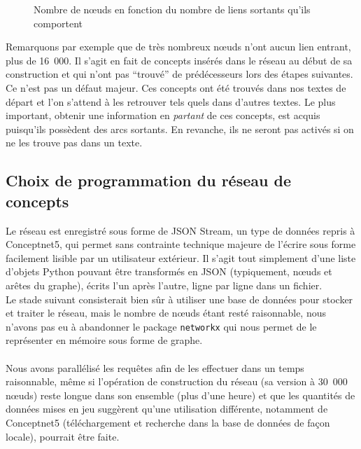 \documentclass[a4paper, 12pt]{article}
\newcommand{\pyt}[1]{\texttt{#1}}%
\begin{document}
\begin{figure}[h]
 \centering
 \caption{Nombre de n\oe{}uds en fonction du nombre de liens sortants qu'ils comportent}
 \label{fig:liens_sortants}
\end{figure}

Remarquons par exemple que de très nombreux n\oe{}uds n'ont aucun lien entrant, plus de 16~000. Il s'agit en fait de concepts insérés dans le réseau au début de sa construction et qui n'ont pas ``trouvé'' de prédécesseurs lors des étapes suivantes. Ce n'est pas un défaut majeur. Ces concepts ont été trouvés dans nos textes de départ et l'on s'attend à les retrouver tels quels dans d'autres textes. Le plus important, obtenir une information en \textit{partant} de ces concepts, est acquis puisqu'ils possèdent des arcs sortants. En revanche, ils ne seront pas activés si on ne les trouve pas dans un texte.


\subsection{Choix de programmation du réseau de concepts}

Le réseau est enregistré sous forme de JSON Stream, un type de données repris à Conceptnet5, qui permet sans contrainte technique majeure de l'écrire sous forme facilement lisible par un utilisateur extérieur. Il s'agit tout simplement d'une liste d'objets Python pouvant être transformés en JSON (typiquement, n\oe{}uds et arêtes du graphe), écrits l'un après l'autre, ligne par ligne dans un fichier.\\

Le stade suivant consisterait bien sûr à utiliser une base de données pour stocker et traiter le réseau, mais le nombre de n\oe{}uds étant resté raisonnable, nous n'avons pas eu à abandonner le package \pyt{networkx} qui nous permet de le représenter en mémoire sous forme de graphe.

\paragraph{}
Nous avons parallélisé les requêtes afin de les effectuer dans un temps raisonnable, même si l'opération de construction du réseau (sa version à 30~000 n\oe{}uds) reste longue dans son ensemble (plus d'une heure) et que les quantités de données mises en jeu suggèrent qu'une utilisation différente, notamment de Conceptnet5 (téléchargement et recherche dans la base de données de façon locale), pourrait être faite.
\end{document}
